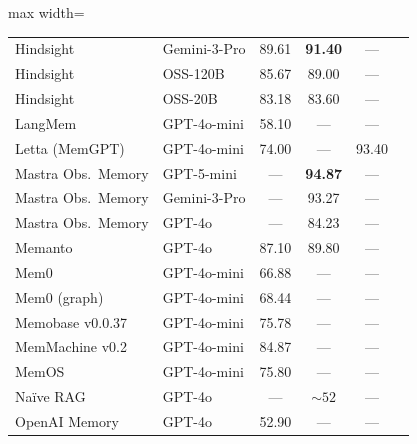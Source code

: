 \begin{table}[!t]
\begin{adjustbox}{max width=\textwidth}
\begin{threeparttable}
\begin{tabular}{@{}llcccl@{}}
Hindsight            & Gemini-3-Pro      & 89.61                & \textbf{91.40}  & ---   & \cite{latimer2025hindsight} \\
Hindsight            & OSS-120B          & 85.67                & 89.00           & ---   & \cite{latimer2025hindsight} \\
Hindsight            & OSS-20B           & 83.18                & 83.60           & ---   & \cite{latimer2025hindsight} \\
LangMem              & GPT-4o-mini       & 58.10                & ---             & ---   & \cite{latimer2025hindsight} \\
Letta (MemGPT)       & GPT-4o-mini       & 74.00                & ---             & 93.40\tnote{e} & \cite{letta2025benchmark,packer2023memgpt} \\
Mastra Obs.\ Memory  & GPT-5-mini        & ---                  & \textbf{94.87}  & ---   & \cite{mastra2026om} \\
Mastra Obs.\ Memory  & Gemini-3-Pro      & ---                  & 93.27           & ---   & \cite{mastra2026om} \\
Mastra Obs.\ Memory  & GPT-4o            & ---                  & 84.23           & ---   & \cite{mastra2026om} \\
Memanto              & GPT-4o            & 87.10                & 89.80           & ---   & \cite{memanto2026} \\
Mem0                 & GPT-4o-mini       & 66.88                & ---             & ---   & \cite{choudhary2025mem0} \\
Mem0 (graph)         & GPT-4o-mini       & 68.44                & ---             & ---   & \cite{choudhary2025mem0,latimer2025hindsight} \\
Memobase v0.0.37     & GPT-4o-mini       & 75.78                & ---             & ---   & \cite{memobase2025,latimer2025hindsight} \\
MemMachine v0.2      & GPT-4o-mini       & 84.87                & ---             & ---   & \cite{memmachine2025} \\
MemOS                & GPT-4o-mini       & 75.80                & ---             & ---   & \cite{memos2025} \\
Na\"ive RAG          & GPT-4o            & ---                  & ${\sim}52$      & ---   & \cite{emergence2025longmemeval} \\
OpenAI Memory        & GPT-4o            & 52.90                & ---             & ---   & \cite{choudhary2025mem0,latimer2025hindsight} \\

\end{tabular}
\end{threeparttable}
\end{adjustbox}
\end{table}
